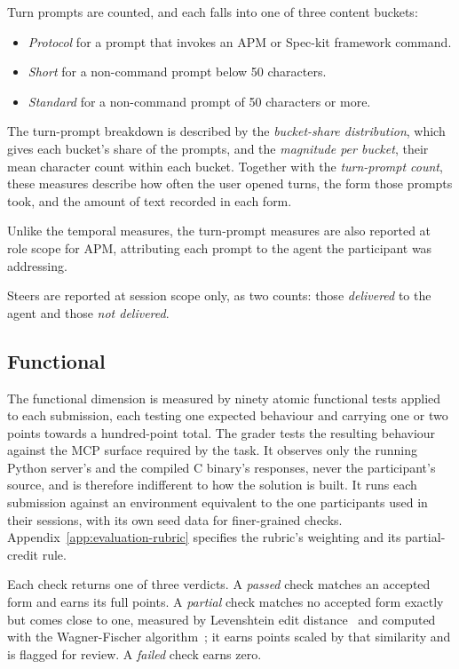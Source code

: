 Turn prompts are counted, and each falls into one of three content buckets:
\begin{itemize}
    \item \emph{Protocol} for a prompt that invokes an APM or Spec-kit framework command.
    \item \emph{Short} for a non-command prompt below 50 characters.
    \item \emph{Standard} for a non-command prompt of 50 characters or more.
\end{itemize}

The turn-prompt breakdown is described by the \emph{bucket-share distribution}, which gives each bucket's share of the prompts, and the \emph{magnitude per bucket}, their mean character count within each bucket. Together with the \emph{turn-prompt count}, these measures describe how often the user opened turns, the form those prompts took, and the amount of text recorded in each form.

Unlike the temporal measures, the turn-prompt measures are also reported at role scope for APM, attributing each prompt to the agent the participant was addressing.

Steers are reported at session scope only, as two counts: those \emph{delivered} to the agent and those \emph{not delivered}.

\subsection{Functional}
\label{sec:evaluation-metrics-functional}

The functional dimension is measured by ninety atomic functional tests applied to each submission, each testing one expected behaviour and carrying one or two points towards a hundred-point total. The grader tests the resulting behaviour against the MCP surface required by the task. It observes only the running Python server's and the compiled C binary's responses, never the participant's source, and is therefore indifferent to how the solution is built. It runs each submission against an environment equivalent to the one participants used in their sessions, with its own seed data for finer-grained checks. Appendix~\ref{app:evaluation-rubric} specifies the rubric's weighting and its partial-credit rule.

Each check returns one of three verdicts. A \emph{passed} check matches an accepted form and earns its full points. A \emph{partial} check matches no accepted form exactly but comes close to one, measured by Levenshtein edit distance~\cite{levenshtein1966binary} and computed with the Wagner-Fischer algorithm~\cite{wagner1974stringcorrection}; it earns points scaled by that similarity and is flagged for review. A \emph{failed} check earns zero.

